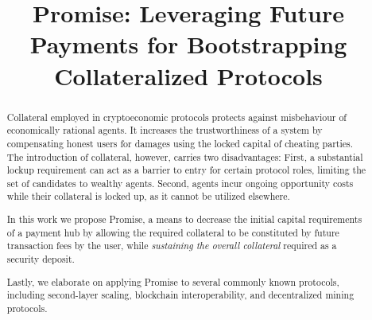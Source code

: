 \documentclass[runningheads]{llncs}
\newcommand{\sys}{Promise\xspace}
\newcommand{\rk}[1]{\todo[linecolor=red,backgroundcolor=red!25,bordercolor=blue,inline,caption={}]{Comment by Rami: #1}}
\newcommand{\dom}[1]{\todo[linecolor=green,backgroundcolor=green!25,bordercolor=green,inline,caption={}]{Comment by Dominik: #1}}
\begin{document}
\title{
\sys: Leveraging Future Payments for Bootstrapping Collateralized Protocols
} 
\author{
}


\date{}
\maketitle


\begin{abstract}
Collateral employed in cryptoeconomic protocols protects against misbehaviour of economically rational agents.
It increases the trustworthiness of a system by compensating honest users for damages using the locked capital of cheating parties.
The introduction of collateral, however, carries two disadvantages:
First, a substantial lockup requirement can act as a barrier to entry for certain protocol roles, limiting the set of candidates to wealthy agents.
Second, agents incur ongoing opportunity costs while their collateral is locked up, as it cannot be utilized elsewhere.

In this work we propose \sys, a means to decrease the initial capital requirements of a payment hub by allowing the required collateral to be constituted by future transaction fees by the user, while \emph{sustaining the overall collateral} required as a security deposit.



Lastly, we elaborate on applying \sys to several commonly known protocols, including second-layer scaling, blockchain interoperability, and decentralized mining protocols.
\end{abstract}
\end{document}
